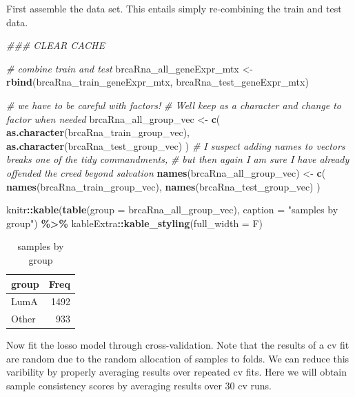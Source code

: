\documentclass[
]{book}
\newenvironment{Shaded}{\begin{snugshade}}{\end{snugshade}}
\newcommand{\CommentTok}[1]{\textcolor[rgb]{0.56,0.35,0.01}{\textit{#1}}}
\newcommand{\DataTypeTok}[1]{\textcolor[rgb]{0.13,0.29,0.53}{#1}}
\newcommand{\KeywordTok}[1]{\textcolor[rgb]{0.13,0.29,0.53}{\textbf{#1}}}
\newcommand{\NormalTok}[1]{#1}
\newcommand{\OperatorTok}[1]{\textcolor[rgb]{0.81,0.36,0.00}{\textbf{#1}}}
\newcommand{\StringTok}[1]{\textcolor[rgb]{0.31,0.60,0.02}{#1}}
\begin{document}
First assemble the data set. This entails simply re-combining the
train and test data.

\begin{Shaded}
\begin{Highlighting}[]
\CommentTok{\#\#\# CLEAR CACHE}

\CommentTok{\# combine train and test }
\NormalTok{brcaRna\_all\_geneExpr\_mtx <{-}}\StringTok{ }\KeywordTok{rbind}\NormalTok{(brcaRna\_train\_geneExpr\_mtx, brcaRna\_test\_geneExpr\_mtx)}

\CommentTok{\# we have to be careful with factors!}
\CommentTok{\# We\textquotesingle{}ll keep as a character and change to factor when needed}
\NormalTok{brcaRna\_all\_group\_vec <{-}}\StringTok{ }\KeywordTok{c}\NormalTok{(}
 \KeywordTok{as.character}\NormalTok{(brcaRna\_train\_group\_vec), }
 \KeywordTok{as.character}\NormalTok{(brcaRna\_test\_group\_vec)}
\NormalTok{)}
\CommentTok{\# I suspect adding names to vectors breaks one of the tidy commandments,}
\CommentTok{\# but then again I am sure I have already offended the creed beyond salvation}
\KeywordTok{names}\NormalTok{(brcaRna\_all\_group\_vec) <{-}}\StringTok{ }\KeywordTok{c}\NormalTok{(}
 \KeywordTok{names}\NormalTok{(brcaRna\_train\_group\_vec),}
 \KeywordTok{names}\NormalTok{(brcaRna\_test\_group\_vec)}
\NormalTok{)}

\NormalTok{knitr}\OperatorTok{::}\KeywordTok{kable}\NormalTok{(}\KeywordTok{table}\NormalTok{(}\DataTypeTok{group =}\NormalTok{ brcaRna\_all\_group\_vec),}
  \DataTypeTok{caption =} \StringTok{"samples by group"}\NormalTok{) }\OperatorTok{\%>\%}
\StringTok{   }\NormalTok{kableExtra}\OperatorTok{::}\KeywordTok{kable\_styling}\NormalTok{(}\DataTypeTok{full\_width =}\NormalTok{ F)}
\end{Highlighting}
\end{Shaded}

\begin{table}

\caption{\label{tab:brca-rnaseq-get-all-data}samples by group}
\centering
\begin{tabular}[t]{l|r}
\hline
group & Freq\\
\hline
LumA & 1492\\
\hline
Other & 933\\
\hline
\end{tabular}
\end{table}

Now fit the losso model through cross-validation.
Note that the results of a cv fit are random due to the
random allocation of samples to folds. We can reduce this
varibility by properly averaging results over repeated cv fits.
Here we will obtain sample consistency scores by averaging results
over 30 cv runs.
\end{document}
